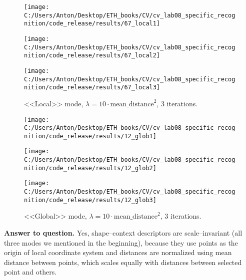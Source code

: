 \documentclass{report}
\begin{document}
\begin{figure}[h]
	\begin{center}
		\label{tang1}
		\begin{minipage}[h]{0.31\linewidth}
			\texttt{[image: C:/Users/Anton/Desktop/ETH\_books/CV/cv\_lab08\_specific\_recognition/code\_release/results/67\_local1]}
		\end{minipage}
		\hfill
		\begin{minipage}[h]{0.31\linewidth}
			\texttt{[image: C:/Users/Anton/Desktop/ETH\_books/CV/cv\_lab08\_specific\_recognition/code\_release/results/67\_local2]}
		\end{minipage}
		\hfill
		\begin{minipage}[h]{0.31\linewidth}
			\texttt{[image: C:/Users/Anton/Desktop/ETH\_books/CV/cv\_lab08\_specific\_recognition/code\_release/results/67\_local3]}
		\end{minipage}
		
		\caption{<<Local>> mode, $\lambda=10\cdot\text{mean\_distance}^2$, 3 iterations.}
	\end{center}
\end{figure}


\begin{figure}[h]
	\begin{center}
		\label{tang1}
		\begin{minipage}[h]{0.31\linewidth}
			\texttt{[image: C:/Users/Anton/Desktop/ETH\_books/CV/cv\_lab08\_specific\_recognition/code\_release/results/12\_glob1]}
		\end{minipage}
		\hfill
		\begin{minipage}[h]{0.31\linewidth}
			\texttt{[image: C:/Users/Anton/Desktop/ETH\_books/CV/cv\_lab08\_specific\_recognition/code\_release/results/12\_glob2]}
		\end{minipage}
		\hfill
		\begin{minipage}[h]{0.31\linewidth}
			\texttt{[image: C:/Users/Anton/Desktop/ETH\_books/CV/cv\_lab08\_specific\_recognition/code\_release/results/12\_glob3]}
		\end{minipage}
		
		\caption{<<Global>> mode, $\lambda=10\cdot\text{mean\_distance}^2$, 3 iterations.}
	\end{center}
\end{figure}
\newpage
\textbf{Answer to question.}
Yes, shape--context descriptors are scale--invariant (all three modes we mentioned in the beginning), because they use points as the origin of local coordinate system and distances are normalized using mean distance between points, which scales equally with distances between selected point and others.
\end{document}
